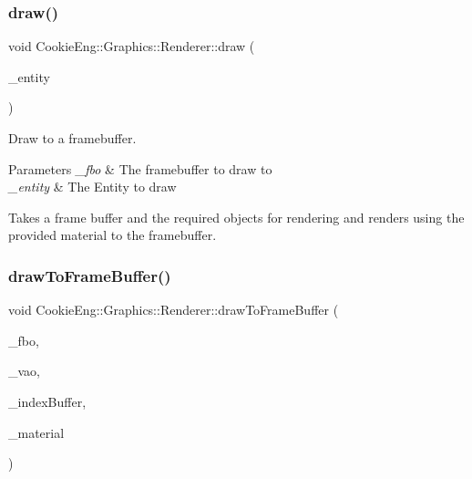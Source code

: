 \subsubsection{\texorpdfstring{draw()}{draw()}}
{\footnotesize\ttfamily void Cookie\+Eng\+::\+Graphics\+::\+Renderer\+::draw (\begin{DoxyParamCaption}\item[{\hyperlink{class_cookie_eng_1_1_e_c_s_1_1_entity}{E\+C\+S\+::\+Entity} \&}]{\+\_\+entity }\end{DoxyParamCaption})}



Draw to a framebuffer. 


\begin{DoxyParams}{Parameters}
{\em \+\_\+fbo} & The framebuffer to draw to \\
\hline
{\em \+\_\+entity} & The Entity to draw\\
\hline
\end{DoxyParams}
Takes a frame buffer and the required objects for rendering and renders using the provided material to the framebuffer. \mbox{\label{class_cookie_eng_1_1_graphics_1_1_renderer_aa32e62971f191a434ab457f9ac84ac31}} 
\subsubsection{\texorpdfstring{draw\+To\+Frame\+Buffer()}{drawToFrameBuffer()}}
{\footnotesize\ttfamily void Cookie\+Eng\+::\+Graphics\+::\+Renderer\+::draw\+To\+Frame\+Buffer (\begin{DoxyParamCaption}\item[{const \hyperlink{class_cookie_eng_1_1_graphics_1_1_frame_buffer}{Frame\+Buffer} \&}]{\+\_\+fbo,  }\item[{const \hyperlink{class_cookie_eng_1_1_graphics_1_1_vertex_array}{Vertex\+Array} \&}]{\+\_\+vao,  }\item[{const \hyperlink{class_cookie_eng_1_1_graphics_1_1_vertex_buffer}{Vertex\+Buffer} \&}]{\+\_\+index\+Buffer,  }\item[{const \hyperlink{class_cookie_eng_1_1_resources_1_1_material}{Resources\+::\+Material} \&}]{\+\_\+material }\end{DoxyParamCaption})}



